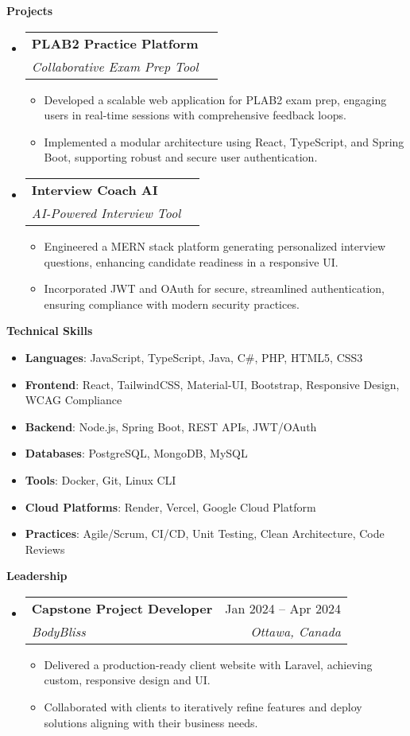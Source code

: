 \documentclass[letterpaper, 10pt]{article}
\makeatletter
\newcommand{\resumeItem}[1]{
  \item\small{
    {#1 \vspace{-2pt}}
  }
}
\newcommand{\resumeSubheading}[4]{
  \vspace{-1pt}\item
    \begin{tabular*}{0.97\textwidth}[t]{l@{\extracolsep{\fill}}r}
      \textbf{#1} & #2 \\
      \textit{\small#3} & \textit{\small #4} \\
    \end{tabular*}\vspace{-5pt}
}
\newcommand{\resumeSubItem}[2]{\resumeItem{\textbf{#1}{: #2 \vspace{-4pt}}}}
\newcommand{\resumeSubHeadingListStart}{\begin{itemize}[leftmargin=0.15in, label={}]}
\newcommand{\resumeSubHeadingListEnd}{\end{itemize}}
\newcommand{\section}[1]{
  \vspace{4pt}\textsc{\large} \textbf{#1}
  \vspace{2pt}
}
\newcommand{\resumeItemListStart}{\begin{itemize}}
\newcommand{\resumeItemListEnd}{\end{itemize}\vspace{-5pt}}
\makeatother
\begin{document}
\section{Projects}
  \resumeSubHeadingListStart
    \resumeSubheading
      {PLAB2 Practice Platform}{}
      {Collaborative Exam Prep Tool}{}
      \resumeItemListStart
        \resumeItem{Developed a scalable web application for PLAB2 exam prep, engaging users in real-time sessions with comprehensive feedback loops.}
        \resumeItem{Implemented a modular architecture using React, TypeScript, and Spring Boot, supporting robust and secure user authentication.}
      \resumeItemListEnd
    \resumeSubheading
      {Interview Coach AI}{}
      {AI-Powered Interview Tool}{}
      \resumeItemListStart
        \resumeItem{Engineered a MERN stack platform generating personalized interview questions, enhancing candidate readiness in a responsive UI.}
        \resumeItem{Incorporated JWT and OAuth for secure, streamlined authentication, ensuring compliance with modern security practices.}
      \resumeItemListEnd
  \resumeSubHeadingListEnd

\section{Technical Skills}
  \resumeSubHeadingListStart
    \resumeSubItem{Languages}{JavaScript, TypeScript, Java, C\#, PHP, HTML5, CSS3}
    \resumeSubItem{Frontend}{React, TailwindCSS, Material-UI, Bootstrap, Responsive Design, WCAG Compliance}
    \resumeSubItem{Backend}{Node.js, Spring Boot, REST APIs, JWT/OAuth}
    \resumeSubItem{Databases}{PostgreSQL, MongoDB, MySQL}
    \resumeSubItem{Tools}{Docker, Git, Linux CLI}
    \resumeSubItem{Cloud Platforms}{Render, Vercel, Google Cloud Platform}
    \resumeSubItem{Practices}{Agile/Scrum, CI/CD, Unit Testing, Clean Architecture, Code Reviews}
  \resumeSubHeadingListEnd

\section{Leadership}
  \resumeSubHeadingListStart
    \resumeSubheading
      {Capstone Project Developer}{Jan 2024 -- Apr 2024}
      {BodyBliss}{Ottawa, Canada}
      \resumeItemListStart
        \resumeItem{Delivered a production-ready client website with Laravel, achieving custom, responsive design and UI.}
        \resumeItem{Collaborated with clients to iteratively refine features and deploy solutions aligning with their business needs.}
      \resumeItemListEnd
  \resumeSubHeadingListEnd
\end{document}
